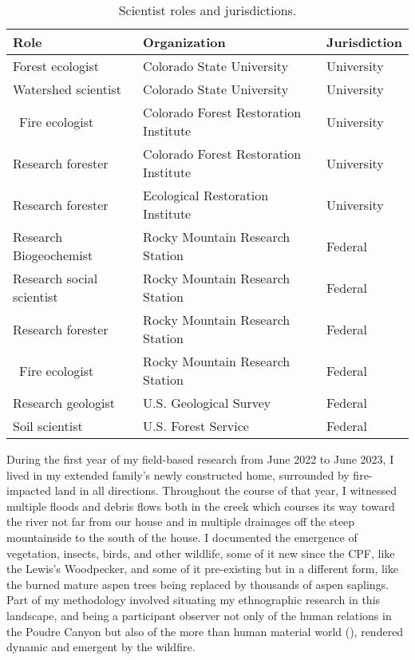 \documentclass[
]{article}
\begin{document}
\begin{table}[!h]
\centering\centering
\caption{\label{tab:ch4Table1}Scientist roles and jurisdictions.}
\centering
\begin{tabu} to 
\toprule
Role & Organization & Jurisdiction\\
\midrule
Forest ecologist & Colorado State University & University\\
Watershed scientist & Colorado State University & University\\
 Fire ecologist & Colorado Forest Restoration Institute & University\\
Research forester & Colorado Forest Restoration Institute & University\\
Research forester & Ecological Restoration Institute & University\\
\addlinespace
Research Biogeochemist & Rocky Mountain Research Station & Federal\\
Research social scientist & Rocky Mountain Research Station & Federal\\
Research forester & Rocky Mountain Research Station & Federal\\
 Fire ecologist & Rocky Mountain Research Station & Federal\\
Research geologist & U.S. Geological Survey & Federal\\
\addlinespace
Soil scientist & U.S. Forest Service & Federal\\
\bottomrule
\end{tabu}
\end{table}

During the first year of my field-based research from June 2022 to June 2023, I lived in my extended family's newly constructed home, surrounded by fire-impacted land in all directions. Throughout the course of that year, I witnessed multiple floods and debris flows both in the creek which courses its way toward the river not far from our house and in multiple drainages off the steep mountainside to the south of the house. I documented the emergence of vegetation, insects, birds, and other wildlife, some of it new since the CPF, like the Lewis's Woodpecker, and some of it pre-existing but in a different form, like the burned mature aspen trees being replaced by thousands of aspen saplings. Part of my methodology involved situating my ethnographic research in this landscape, and being a participant observer not only of the human relations in the Poudre Canyon but also of the more than human material world (), rendered dynamic and emergent by the wildfire.
\end{document}
